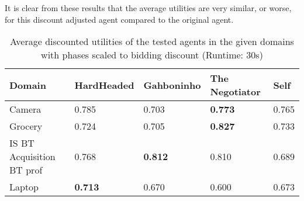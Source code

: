 It is clear from these results that the average utilities are very similar, or worse, for this discount adjusted agent compared to the original agent.

\begin{table}[H]
  \centering
  \small
  \begin{tabular}{lp{2.5cm}p{2.5cm}p{2.5cm}p{2.5cm}}
      \toprule
    Domain & HardHeaded & Gahboninho & The Negotiator & Self \\
    \midrule
    Camera & 0.785 & 0.703 & \textbf{0.773} & 0.765 \\
    Grocery & 0.724 & 0.705 & \textbf{0.827} & 0.733 \\
    IS BT Acquisition BT prof & 0.768 & \textbf{0.812} & 0.810 & 0.689 \\
    Laptop & \textbf{0.713} & 0.670 & 0.600 & 0.673 \\
   \bottomrule
  \end{tabular}
  \caption{Average discounted utilities of the tested agents in the given domains with phases scaled to bidding discount (Runtime: $30$s) \label{table:anac2011-domains3}}
\end{table}
